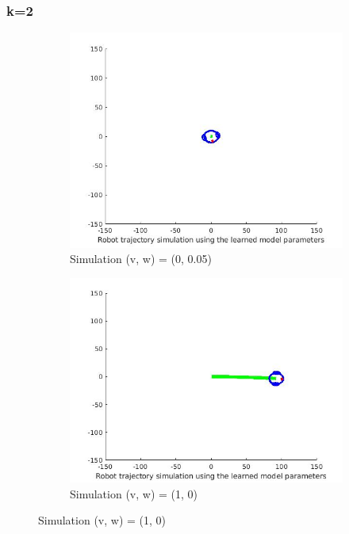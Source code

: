 \documentclass{article}
\begin{document}
\subsubsection*{k=2}
\begin{figure}[ht]
	\begin{subfigure}{.5\textwidth}
		\centering
		\includegraphics[width=1.\linewidth]{1a.jpg}  
		\caption{Simulation (v, w) = (0, 0.05)}
	\end{subfigure}
	\begin{subfigure}{.5\textwidth}
		\centering
		\includegraphics[width=1.\linewidth]{1b.jpg}  
		\caption{Simulation (v, w) = (1, 0)}

\end{subfigure}
\end{figure}
\end{document}
